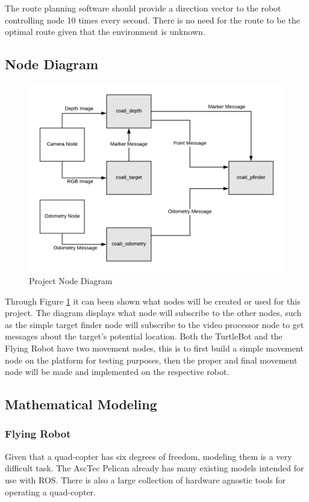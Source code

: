 \documentclass{article}
\begin{document}
	The route planning software should provide a direction vector to the robot controlling node 10 times every second. There is no need for the route to be the optimal route given that the environment is unknown.

	\subsection{Node Diagram}

	\begin{figure}[H]
		\centering
		\includegraphics[width=0.8\linewidth]{NodeDiagram}
		\caption{Project Node Diagram}
		\label{fig:nodediagram}
	\end{figure}


	Through Figure \ref{fig:nodediagram} it can been shown what nodes will be created or used for this project. The diagram displays what node will subscribe to the other nodes, such as the simple target finder node will subscribe to the video processor node to get messages about the target's potential location. Both the TurtleBot and the Flying Robot have two movement nodes, this is to first build a simple movement node on the platform for testing purposes, then the proper and final movement node will be made and implemented on the respective robot. 

	
	\subsection{Mathematical Modeling}
	
		\subsubsection{Flying Robot}
	
		Given that a quad-copter has six degrees of freedom, modeling them is a very difficult task. The AscTec Pelican already has many existing models intended for use with ROS. There is also a large collection of hardware agnostic tools for operating a quad-copter.
	
\end{document}
